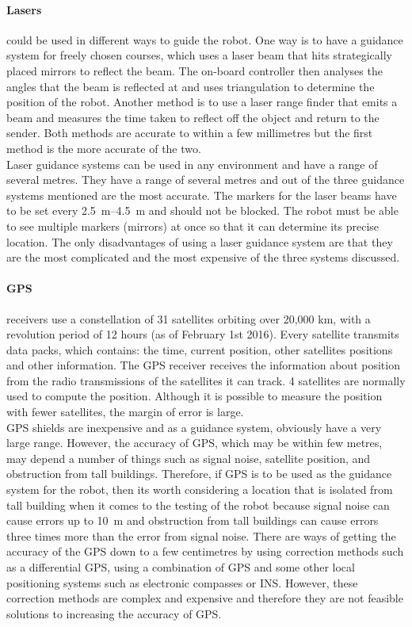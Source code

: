         \paragraph{Lasers} could be used in different ways to guide the robot. One way is to have a guidance system for freely chosen courses, which uses a laser beam that hits strategically placed mirrors to reflect the beam. The on-board controller then analyses the angles that the beam is reflected at and uses triangulation to determine the position of the robot. Another method is to use a laser range finder that emits a beam and measures the time taken to reflect off the object and return to the sender. Both methods are accurate to within a few millimetres but the first method is the more accurate of the two.\\
        Laser guidance systems can be used in any environment and have a range of several metres. They have a range of several metres and out of the three guidance systems mentioned are the most accurate. The markers for the laser beams have to be set every \SIrange{2.5}{4.5}{\meter} and should not be blocked. The robot must be able to see multiple markers (mirrors) at once so that it can determine its precise location. The only disadvantages of using a laser guidance system are that they are the most complicated and the most expensive of the three systems discussed.

        \paragraph{\gls{GPS}} receivers use a constellation of 31 satellites orbiting over 20,000 km, with a revolution period of 12 hours (as of February 1st 2016). Every satellite transmits data packs, which contains: the time, current position, other satellites positions and other information. The \gls{GPS} receiver receives the information about position from the radio transmissions of the satellites it can track. 4 satellites are normally used to compute the position. Although it is possible to measure the position with fewer satellites, the margin of error is large.\\
        \gls{GPS} \glspl{shield} are inexpensive and as a guidance system, obviously have a very large range.  However, the accuracy of \gls{GPS}, which may be within few metres, may depend a number of things such as signal noise, satellite position, and obstruction from tall buildings. Therefore, if GPS is to be used as the guidance system for the robot, then its worth considering a location that is isolated from tall building when it comes to the testing of the robot because signal noise can cause errors up to \SI{10}{\meter} and obstruction from tall buildings can cause errors three times more than the error from signal noise.\cite{gpsbasics} There are ways of getting the accuracy of the \gls{GPS} down to a few centimetres by using correction methods such as a differential \gls{GPS}, using a combination of \gls{GPS} and some other local positioning systems such as electronic compasses or \gls{INS}. However, these correction methods are complex and expensive and therefore they are not feasible solutions to increasing the accuracy of \gls{GPS}.

